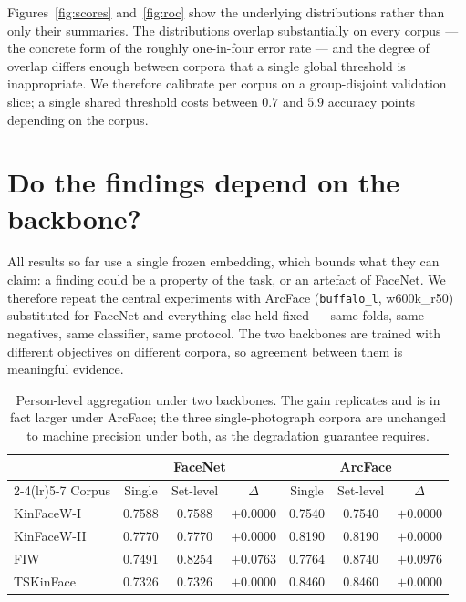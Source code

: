 \documentclass[journal,12pt]{IEEEtran}
\begin{document}
Figures~\ref{fig:scores} and~\ref{fig:roc} show the underlying distributions
rather than only their summaries. The distributions overlap substantially on
every corpus --- the concrete form of the roughly one-in-four error rate --- and
the degree of overlap differs enough between corpora that a single global
threshold is inappropriate. We therefore calibrate per corpus on a
group-disjoint validation slice; a single shared threshold costs between $0.7$
and $5.9$ accuracy points depending on the corpus.

\section{Do the findings depend on the backbone?}
\label{sec:backbone}

All results so far use a single frozen embedding, which bounds what they can
claim: a finding could be a property of the task, or an artefact of FaceNet. We
therefore repeat the central experiments with ArcFace (\texttt{buffalo\_l},
w600k\_r50) substituted for FaceNet and everything else held fixed --- same
folds, same negatives, same classifier, same protocol. The two backbones are
trained with different objectives on different corpora, so agreement between
them is meaningful evidence.

\begin{table}[t]
\centering
\caption{Person-level aggregation under two backbones. The gain replicates and
is in fact larger under ArcFace; the three single-photograph corpora are
unchanged to machine precision under both, as the degradation guarantee
requires.}
\label{tab:backbone}
\begin{tabular}{lcccccc}
\toprule
& \multicolumn{3}{c}{FaceNet} & \multicolumn{3}{c}{ArcFace} \\
\cmidrule(lr){2-4}\cmidrule(lr){5-7}
Corpus & Single & Set-level & $\Delta$ & Single & Set-level & $\Delta$ \\
\midrule
KinFaceW-I & 0.7588 & 0.7588 & $+0.0000$ & 0.7540 & 0.7540 & $+0.0000$ \\
KinFaceW-II & 0.7770 & 0.7770 & $+0.0000$ & 0.8190 & 0.8190 & $+0.0000$ \\
FIW & 0.7491 & 0.8254 & $+0.0763$ & 0.7764 & 0.8740 & $+0.0976$ \\
TSKinFace & 0.7326 & 0.7326 & $+0.0000$ & 0.8460 & 0.8460 & $+0.0000$ \\
\bottomrule
\end{tabular}
\end{table}
\end{document}

